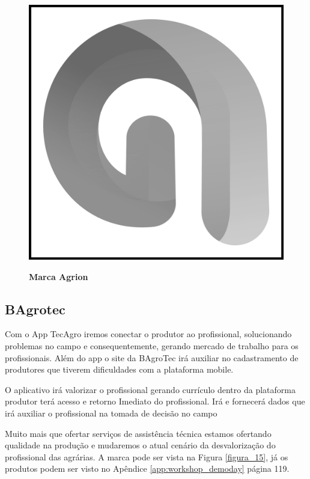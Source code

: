 \begin{figure}[H]
\centering
\caption{\textbf{Marca Agrion}}
\includegraphics[scale=0.07]{Imagens/agrion.png}
\label{figura_14}
\end{figure}

\subsection{BAgrotec}

Com o App TecAgro iremos conectar o produtor ao profissional, solucionando problemas no campo e consequentemente, gerando mercado de trabalho para os profissionais. Além do app o site da BAgroTec irá auxiliar no cadastramento de produtores que tiverem dificuldades com a plataforma mobile.  

O aplicativo irá valorizar o profissional gerando currículo dentro da plataforma  produtor terá acesso e retorno Imediato do profissional. Irá e fornecerá dados que irá auxiliar o profissional na tomada de decisão no campo

Muito mais que ofertar serviços de assistência técnica estamos ofertando qualidade na produção e mudaremos o atual cenário da desvalorização do profissional das agrárias. A marca pode ser vista na Figura \ref{figura_15}, já os produtos podem ser visto no Apêndice \ref{app:workshop_demoday} página 119.

